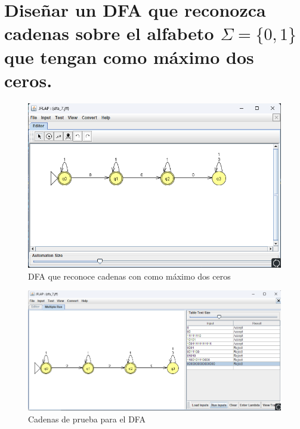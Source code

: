 \documentclass[11pt]{report}
\begin{document}
\section{Diseñar un DFA que reconozca cadenas sobre el alfabeto $\Sigma = \{0, 1\}$ que tengan como máximo dos ceros.}
\begin{figure}[H]
  \centering
  \includegraphics[scale=0.6]{img/DFA_07.png}
  \caption{DFA que reconoce cadenas con como máximo dos ceros}
\end{figure}

\begin{figure}[H]
  \centering
  \includegraphics[scale=0.65]{img/DFA_07_test.png}
  \caption{Cadenas de prueba para el DFA}
\end{figure}

\newpage
\end{document}
